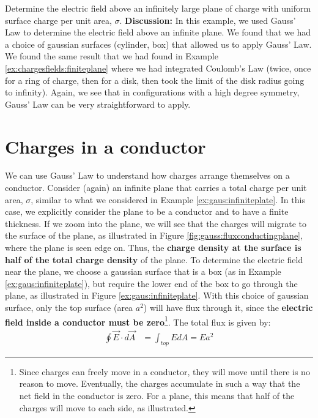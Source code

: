 \begin{example}{Determine the electric field above an infinitely large plane of charge with uniform surface charge per unit area, $\sigma$.}
\textbf{Discussion: }In this example, we used Gauss' Law to determine the electric field above an infinite plane. We found that we had a choice of gaussian surfaces (cylinder, box) that allowed us to apply Gauss' Law. We found the same result that we had found in Example \ref{ex:chargesfields:finiteplane} where we had integrated Coulomb's Law (twice, once for a ring of charge, then for a disk, then took the limit of the disk radius going to infinity). Again, we see that in configurations with a high degree symmetry, Gauss' Law can be very straightforward to apply.
\end{example}

\section{Charges in a conductor}
\label{sec:gauss:conductors}
We can use Gauss' Law to understand how charges arrange themselves on a conductor. Consider (again) an infinite plane that carries a total charge per unit area, $\sigma$, similar to what we considered in Example \ref{ex:gaus:infiniteplate}. In this case, we explicitly consider the plane to be a conductor and to have a finite thickness. If we zoom into the plane, we will see that the charges will migrate to the surface of the plane, as illustrated in Figure \ref{fig:gauss:fluxconductingplane}, where the plane is seen edge on. Thus, the \textbf{charge density at the surface is half of the total charge density} of the plane.
To determine the electric field near the plane, we choose a gaussian surface that is a box (as in Example \ref{ex:gaus:infiniteplate}), but require the lower end of the box to go through the plane, as illustrated in Figure \ref{ex:gaus:infiniteplate}. With this choice of gaussian surface, only the top surface (area $a^2$) will have flux through it, since the \textbf{electric field inside a conductor must be zero}\footnote{Since charges can freely move in a conductor, they will move until there is no reason to move. Eventually, the charges accumulate in such a way that the net field in the conductor is zero. For a plane, this means that half of the charges will move to each side, as illustrated.}. The total flux is given by:
\begin{align*}
\oint \vec E\cdot d\vec A&= \int_{top} EdA=Ea^2
\end{align*}
